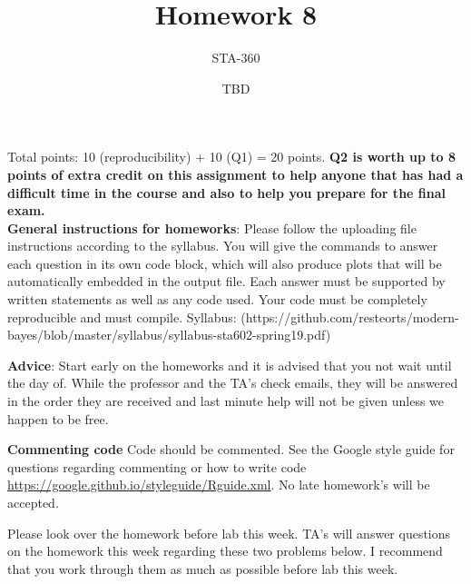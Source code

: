 \documentclass{article}
\begin{document}
\title{Homework 8}
\author{STA-360}
\date{TBD}
\maketitle

Total points: 10 (reproducibility) + 10 (Q1) = 20 points. \textbf{Q2 is worth up to 8 points of extra credit on this assignment to help anyone that has had a difficult time in the course and also to help you prepare for the final exam.} \\

\textbf{General instructions for homeworks}: Please follow the uploading file instructions according to the syllabus. You will give the commands to answer each question in its own code block, which will also produce plots that will be automatically embedded in the output file. Each answer must be supported by written statements as well as any code used. Your code must be completely reproducible and must compile. Syllabus: (https://github.com/resteorts/modern-bayes/blob/master/syllabus/syllabus-sta602-spring19.pdf)

\textbf{Advice}: Start early on the homeworks and it is advised that you not wait until the day of. While the professor and the TA's check emails, they will be answered in the order they are received and last minute help will not be given unless we happen to be free.  

\textbf{Commenting code}
Code should be commented. See the Google style guide for questions regarding commenting or how to write 
code \url{https://google.github.io/styleguide/Rguide.xml}. No late homework's will be accepted.

Please look over the homework before lab this week. TA's will answer questions on the homework this week regarding these two 
problems below. I recommend that you work through them as much as possible before lab this week. 
\end{document}
